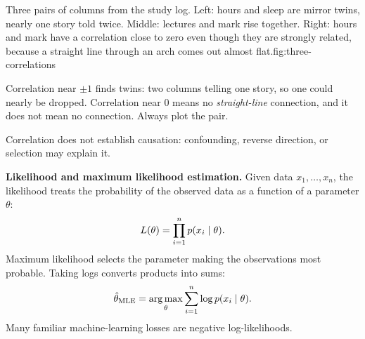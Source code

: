 \begin{utpfig}{Three pairs of columns from the study log. Left: hours and sleep are mirror twins, nearly one story told twice. Middle: lectures and mark rise together. Right: hours and mark have a correlation close to zero even though they are strongly related, because a straight line through an arch comes out almost flat.}{fig:three-correlations}
\end{utpfig}

\begin{keyidea}
Correlation near $\pm1$ finds twins: two columns telling one story, so one could nearly be dropped. Correlation near 0 means no \emph{straight-line} connection, and it does not mean no connection. Always plot the pair.
\end{keyidea}

\begin{pitfall}
Correlation does not establish causation: confounding, reverse direction, or selection may explain it.
\end{pitfall}

\begin{optionaltopic}
\textbf{Likelihood and maximum likelihood estimation.} Given data $x_1,\ldots,x_n$, the likelihood treats the probability of the observed data as a function of a parameter $\theta$:
\[
L(\theta)=\prod_{i=1}^{n}p(x_i\mathrel{|}\theta).
\]
Maximum likelihood selects the parameter making the observations most probable. Taking logs converts products into sums:
\[
\hat{\theta}_{\mathrm{MLE}}=\operatorname*{arg\,max}_{\theta}\sum_{i=1}^{n}\log p(x_i\mathrel{|}\theta).
\]
Many familiar machine-learning losses are negative log-likelihoods.
\end{optionaltopic}

